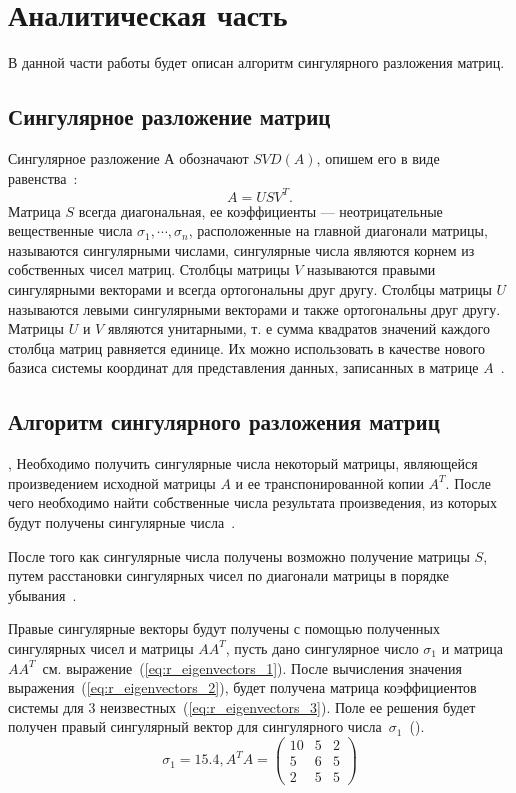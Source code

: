 \chapter{Аналитическая часть}
В данной части работы будет описан алгоритм сингулярного разложения матриц.






\section{Сингулярное разложение матриц}
Сингулярное разложение $А$ обозначают
$SVD(A)$, опишем его в виде равенства~\cite{SVD}:
\begin{equation}
	A = USV^{T}.
	\label{eq:SVD_def}
\end{equation}
Матрица $S$ всегда диагональная, ее коэффициенты –-- неотрицательные вещественные числа $\sigma_{1}, \cdots, \sigma_{n}$, расположенные на главной диагонали матрицы, называются сингулярными числами, сингулярные числа являются корнем из собственных чисел матриц. Столбцы матрицы $V$ называются правыми сингулярными векторами и всегда ортогональны 
друг другу. Столбцы матрицы $U$ называются левыми сингулярными векторами и также ортогональны друг другу. Матрицы $U$ и $V$ являются унитарными, т. е сумма квадратов значений каждого столбца матриц равняется единице. Их можно использовать в качестве нового базиса системы координат для представления данных, записанных в матрице $A$~\cite{SVD}.

\section{Алгоритм сингулярного разложения матриц}
, Необходимо получить сингулярные числа некоторый матрицы, являющейся  произведением исходной матрицы $A$ и ее транспонированной копии $A^{T}$. После чего необходимо найти собственные числа результата произведения, из которых будут получены сингулярные числа~\cite{SVD,pers_val}.

После того как сингулярные числа получены возможно получение матрицы $S$, путем расстановки сингулярных чисел по диагонали матрицы в порядке убывания~\cite{SVD_algo}.

Правые сингулярные векторы будут получены с помощью полученных сингулярных чисел и матрицы $AA^{T}$, пусть дано сингулярное число $\sigma_{1}$ и матрица $AA^{T}$~см. выражение~(\ref{eq:r_eigenvectors_1}). После вычисления значения выражения~(\ref{eq:r_eigenvectors_2}), будет получена матрица коэффициентов системы для 3 неизвестных~(\ref{eq:r_eigenvectors_3}). Поле ее решения будет получен правый сингулярный вектор для сингулярного числа~$\sigma_{1}$~(\cite{SVD_algo}).
\begin{equation}
	\sigma_{1}=15.4, A^{T}A=\begin{pmatrix}
	10 & 5 & 2\\ 
	5 & 6  &5\\
		2 & 5 & 5
	\end{pmatrix}
	\label{eq:r_eigenvectors_1}
\end{equation}

